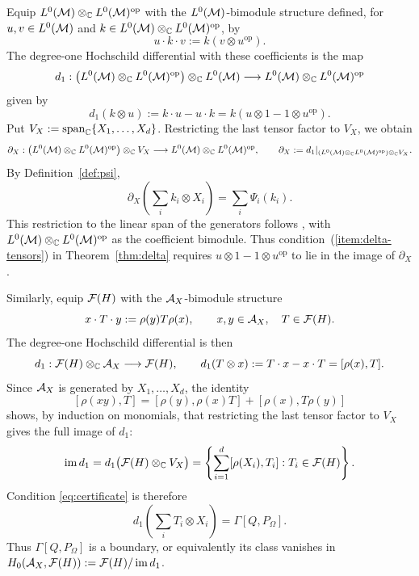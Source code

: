 \begin{remark}\label{rem:boundary-interpretation}
Equip $L^0(\mathcal M)\otimes_{\mathbb C}L^0(\mathcal M)^{\mathrm{op}}$ with the $L^0(\mathcal M)$-bimodule structure defined, for $u,v\in L^0(\mathcal M)$ and $k\in L^0(\mathcal M)\otimes_{\mathbb C}L^0(\mathcal M)^{\mathrm{op}}$, by
\[
 u\cdot k\cdot v:=k(v\otimes u^{\mathrm{op}}).
\]
The degree-one Hochschild differential with these coefficients \cite[Section~9.1.1, p.~300]{Wei94} is the map
\[
 d_1:\bigl(L^0(\mathcal M)\otimes_{\mathbb C}L^0(\mathcal M)^{\mathrm{op}}\bigr)
 \otimes_{\mathbb C}L^0(\mathcal M)
 \longrightarrow L^0(\mathcal M)\otimes_{\mathbb C}L^0(\mathcal M)^{\mathrm{op}}
\]
given by
\[
 d_1(k\otimes u):=k\cdot u-u\cdot k
 =k(u\otimes1-1\otimes u^{\mathrm{op}}).
\]
Put $V_X:=\operatorname{span}_{\mathbb C}\{X_1,\ldots,X_d\}$.
Restricting the last tensor factor to $V_X$, we obtain
\[
 \partial_X:
 \bigl(L^0(\mathcal M)\otimes_{\mathbb C}L^0(\mathcal M)^{\mathrm{op}}\bigr)
 \otimes_{\mathbb C}V_X
 \longrightarrow L^0(\mathcal M)\otimes_{\mathbb C}L^0(\mathcal M)^{\mathrm{op}},
 \qquad \partial_X:=d_1|_{(L^0(\mathcal M)\otimes_{\mathbb C}L^0(\mathcal M)^{\mathrm{op}})\otimes_{\mathbb C}V_X}.
\]
By Definition~\ref{def:psi},
\[
 \partial_X\!\left(\sum_i k_i\otimes X_i\right)
 =\sum_i\Psi_i(k_i).
\]
This restriction to the linear span of the generators follows \cite[Section~3.1.1, equation~(3.1)]{CS05}, with $L^0(\mathcal M)\otimes_{\mathbb C}L^0(\mathcal M)^{\mathrm{op}}$ as the coefficient bimodule.
Thus condition~\textup{(\ref{item:delta-tensors})} in Theorem~\ref{thm:delta} requires $u\otimes1-1\otimes u^{\mathrm{op}}$ to lie in the image of $\partial_X$.

Similarly, equip $\mathcal F(H)$ with the $\mathcal A_X$-bimodule structure
\[
 x\cdot T\cdot y:=\rho(y)T\rho(x),
 \qquad x,y\in\mathcal A_X,\quad T\in\mathcal F(H).
\]
The degree-one Hochschild differential is then
\[
 d_1:\mathcal F(H)\otimes_{\mathbb C}\mathcal A_X\longrightarrow\mathcal F(H),
 \qquad d_1(T\otimes x):=T\cdot x-x\cdot T=[\rho(x),T].
\]
Since $\mathcal A_X$ is generated by $X_1,\ldots,X_d$, the identity
\[
 [\rho(xy),T]
 =[\rho(y),\rho(x)T]+[\rho(x),T\rho(y)]
\]
shows, by induction on monomials, that restricting the last tensor factor to $V_X$ gives the full image of $d_1$:
\[
 \operatorname{im}d_1
 =d_1\bigl(\mathcal F(H)\otimes_{\mathbb C}V_X\bigr)
 =\left\{\sum_{i=1}^d[\rho(X_i),T_i]:T_i\in\mathcal F(H)\right\}.
\]
Condition \eqref{eq:certificate} is therefore
\[
 d_1\!\left(\sum_iT_i\otimes X_i\right)=\Gamma[Q,P_\Omega].
\]
Thus $\Gamma[Q,P_\Omega]$ is a boundary, or equivalently its class vanishes in $H_0(\mathcal A_X,\mathcal F(H)):=\mathcal F(H)/\operatorname{im}d_1$.
\end{remark}
